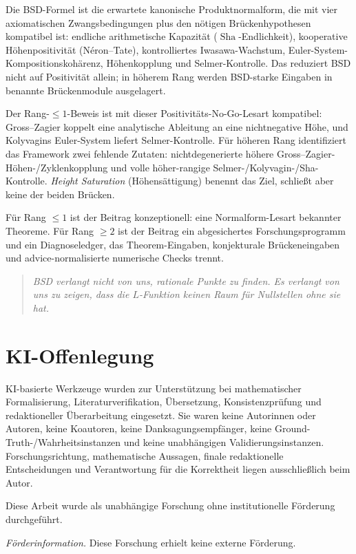 \documentclass[aps,prd,twocolumn,superscriptaddress,nofootinbib,floatfix]{revtex4-2}
\theoremstyle{definition}
\theoremstyle{remark}
\DeclareMathOperator{\Sha}{Sha}
\begin{document}
Die BSD-Formel ist die erwartete kanonische Produktnormalform, die mit vier axiomatischen Zwangsbedingungen plus den nötigen Brückenhypothesen kompatibel ist: endliche arithmetische Kapazität ($\Sha$-Endlichkeit), kooperative Höhenpositivität (Néron--Tate), kontrolliertes Iwasawa-Wachstum, Euler-System-Kompositionskohärenz, Höhenkopplung und Selmer-Kontrolle. Das reduziert BSD nicht auf Positivität allein; in höherem Rang werden BSD-starke Eingaben in benannte Brückenmodule ausgelagert.

Der Rang-$\leq 1$-Beweis ist mit dieser Positivitäts-No-Go-Lesart kompatibel: Gross--Zagier koppelt eine analytische Ableitung an eine nichtnegative Höhe, und Kolyvagins Euler-System liefert Selmer-Kontrolle. Für höheren Rang identifiziert das Framework zwei fehlende Zutaten: nichtdegenerierte höhere Gross--Zagier-Höhen-/Zyklenkopplung und volle höher-rangige Selmer-/Kolyvagin-/Sha-Kontrolle. \textit{Height Saturation} (Höhensättigung) benennt das Ziel, schließt aber keine der beiden Brücken.

Für Rang $\leq 1$ ist der Beitrag konzeptionell: eine Normalform-Lesart bekannter Theoreme. Für Rang $\geq 2$ ist der Beitrag ein abgesichertes Forschungsprogramm und ein Diagnoseledger, das Theorem-Eingaben, konjekturale Brückeneingaben und advice-normalisierte numerische Checks trennt.

\begin{quote}
\textit{\glqq BSD verlangt nicht von uns, rationale Punkte zu finden. Es verlangt von uns zu zeigen, dass die $L$-Funktion keinen Raum für Nullstellen ohne sie hat.\grqq{}}
\end{quote}

\section*{KI-Offenlegung}
KI-basierte Werkzeuge wurden zur Unterstützung bei mathematischer Formalisierung, Literaturverifikation, Übersetzung, Konsistenzprüfung und redaktioneller Überarbeitung eingesetzt. Sie waren keine Autorinnen oder Autoren, keine Koautoren, keine Danksagungsempfänger, keine Ground-Truth-/Wahrheitsinstanzen und keine unabhängigen Validierungsinstanzen. Forschungsrichtung, mathematische Aussagen, finale redaktionelle Entscheidungen und Verantwortung für die Korrektheit liegen ausschließlich beim Autor.


\begin{acknowledgments}
Diese Arbeit wurde als unabhängige Forschung ohne institutionelle Förderung durchgeführt.

\textit{Förderinformation.} Diese Forschung erhielt keine externe Förderung.
\end{acknowledgments}
\end{document}
